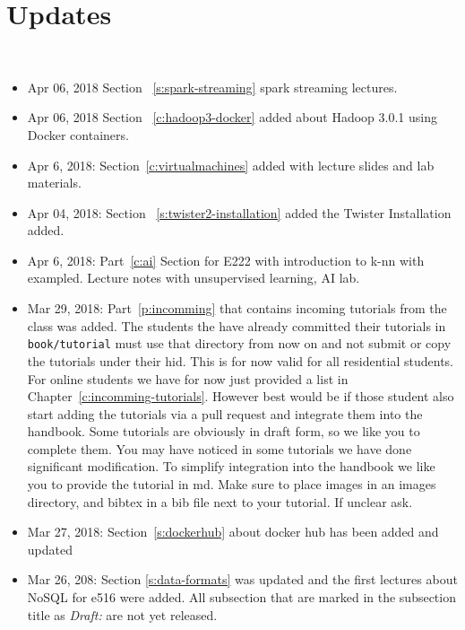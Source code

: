 
\chapter{Updates}
\FILENAME\


\begin{itemize}

\item Apr 06, 2018 Section ~\ref{s:spark-streaming} spark streaming lectures.  

\item Apr 06, 2018 Section ~\ref{c:hadoop3-docker} added about Hadoop 3.0.1 using Docker containers.

\item Apr 6, 2018: Section~\ref{c:virtualmachines} added with lecture slides and lab materials.

\item Apr 04, 2018: Section ~\ref{s:twister2-installation} added the Twister Installation added.

\item Apr 6, 2018: Part~\ref{c:ai} Section for E222 with
  introduction to k-nn with exampled. Lecture notes with unsupervised
  learning, AI lab.

\item Mar 29, 2018: Part~\ref{p:incomming} that contains incoming
  tutorials from the class was added. The students the have already
  committed their tutorials in \verb|book/tutorial| must use that
  directory from now on and not submit or copy the tutorials under
  their hid. This is for now valid for all residential students.  For
  online students we have for now just provided a list in
  Chapter~\ref{c:incomming-tutorials}. However best would be if those
  student also start adding the tutorials via a pull request and
  integrate them into the handbook. Some tutorials are obviously in
  draft form, so we like you to complete them. You may have noticed in
  some tutorials we have done significant modification. To simplify
  integration into the handbook we like you to provide the tutorial in
  md. Make sure to place images in an images directory, and bibtex in
  a bib file next to your tutorial. If unclear ask.

\item Mar 27, 2018: Section~\ref{s:dockerhub} about docker hub has
  been added and updated

\item Mar 26, 208: Section \ref{s:data-formats} was updated and the
  first lectures about NoSQL for e516 were added. All subsection that
  are marked in the subsection title as \emph{Draft:} are not yet released.


\end{itemize}
